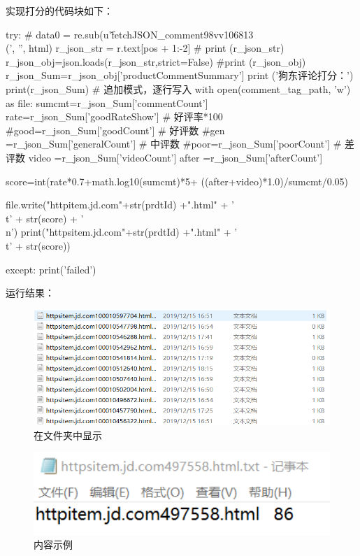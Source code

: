 实现打分的代码块如下：
\begin{python}
    try:
        # data0 = re.sub(u'\^fetchJSON\_comment98vv106813\\(', '', html)
        r\_json\_str = r.text[pos + 1:-2]
        # print (r\_json\_str)
        r\_json\_obj=json.loads(r\_json\_str,strict=False)
        #print (r\_json\_obj)
        r\_json\_Sum=r\_json\_obj['productCommentSummary']
        print ('狗东评论打分：')
        print(r\_json\_Sum)
        # 追加模式，逐行写入
        with open(comment\_tag\_path, 'w') as file:
            sumcmt=r\_json\_Sum['commentCount']
            rate=r\_json\_Sum['goodRateShow'] # 好评率*100
            #good=r\_json\_Sum['goodCount'] # 好评数
            #gen =r\_json\_Sum['generalCount'] # 中评数
            #poor=r\_json\_Sum['poorCount'] # 差评数
            video =r\_json\_Sum['videoCount']
            after =r\_json\_Sum['afterCount']

            score=int(rate*0.7+math.log10(sumcmt)*5+
                          ((after+video)*1.0)/sumcmt/0.05)


            file.write("httpitem.jd.com"+str(prdtId) +".html"
                       + '\\t' + str(score) + '\\n')
            print("httpsitem.jd.com"+str(prdtId) +".html"
                       + '\\t' + str(score))

    except:
        print('failed')
\end{python}

运行结果：
\begin{figure}[htbp]
\centering
\includegraphics[width=13.5cm]{TIM图片20200111220748.png}
\caption{在文件夹中显示}
\end{figure}

\begin{figure}[htbp]
\centering
\includegraphics[width=13.5cm]{TIM图片20200111212528.png}
\caption{内容示例}
\end{figure}


